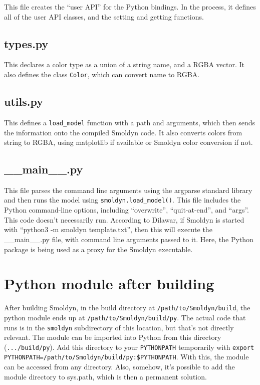 \documentclass {scrbook}
\newcommand {\ttt} {\texttt}
\begin{document}
This file creates the ``user API'' for the Python bindings. In the process, it defines all of the user API classes, and the setting and getting functions.

\subsection*{types.py}

This declares a color type as a union of a string name, and a RGBA vector. It also defines the class \ttt{Color}, which can convert name to RGBA.

\subsection*{utils.py}

This defines a \ttt{load\_model} function with a path and arguments, which then sends the information onto the compiled Smoldyn code. It also converts colors from string to RGBA, using matplotlib if available or Smoldyn color conversion if not.

\subsection*{\_\_main\_\_.py}

This file parses the command line arguments using the argparse standard library and then runs the model using \ttt{smoldyn.load\_model()}. This file includes the Python command-line options, including ``overwrite'', ``quit-at-end'', and ``args''. This code doesn't necessarily run. According to Dilawar, if Smoldyn is started with ``python3 -m smoldyn template.txt'', then this will execute the \_\_main\_\_.py file, with command line arguments passed to it. Here, the Python package is being used as a proxy for the Smoldyn executable.

\section{Python module after building}

After building Smoldyn, in the build directory at \ttt{/path/to/Smoldyn/build}, the python module ends up at \ttt{/path/to/Smoldyn/build/py}. The actual code that runs is in the \ttt{smoldyn} subdirectory of this location, but that's not directly relevant. The module can be imported into Python from this directory (\ttt{.../build/py}). Add this directory to your \ttt{PYTHONPATH} temporarily with \ttt{export PYTHONPATH=/path/to/Smoldyn/build/py:\$PYTHONPATH}. With this, the module can be accessed from any directory. Also, somehow, it's possible to add the module directory to sys.path, which is then a permanent solution.
\end{document}
